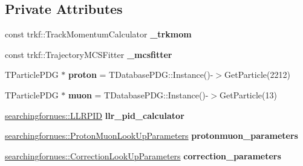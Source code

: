 \subsection*{Private Attributes}
\begin{DoxyCompactItemize}
\item 
const trkf\+::\+Track\+Momentum\+Calculator {\bfseries \+\_\+trkmom}\hypertarget{classanalysis_1_1TrackAnalysis_a22599de9de269967cfdfb8490fcc3897}{}\label{classanalysis_1_1TrackAnalysis_a22599de9de269967cfdfb8490fcc3897}

\item 
const trkf\+::\+Trajectory\+M\+C\+S\+Fitter {\bfseries \+\_\+mcsfitter}\hypertarget{classanalysis_1_1TrackAnalysis_a97631d64480702a4b7589a5bb9d735aa}{}\label{classanalysis_1_1TrackAnalysis_a97631d64480702a4b7589a5bb9d735aa}

\item 
T\+Particle\+P\+DG $\ast$ {\bfseries proton} = T\+Database\+P\+D\+G\+::\+Instance()-\/$>$Get\+Particle(2212)\hypertarget{classanalysis_1_1TrackAnalysis_a4adc7f89c334ab93747a8d4c4abbcc6d}{}\label{classanalysis_1_1TrackAnalysis_a4adc7f89c334ab93747a8d4c4abbcc6d}

\item 
T\+Particle\+P\+DG $\ast$ {\bfseries muon} = T\+Database\+P\+D\+G\+::\+Instance()-\/$>$Get\+Particle(13)\hypertarget{classanalysis_1_1TrackAnalysis_a0fe3b9e7864aaaa36b5f52826b4e3eb9}{}\label{classanalysis_1_1TrackAnalysis_a0fe3b9e7864aaaa36b5f52826b4e3eb9}

\item 
\hyperlink{classsearchingfornues_1_1LLRPID}{searchingfornues\+::\+L\+L\+R\+P\+ID} {\bfseries llr\+\_\+pid\+\_\+calculator}\hypertarget{classanalysis_1_1TrackAnalysis_a9aa071870faf165eb6548f0ea16e4132}{}\label{classanalysis_1_1TrackAnalysis_a9aa071870faf165eb6548f0ea16e4132}

\item 
\hyperlink{structsearchingfornues_1_1ProtonMuonLookUpParameters}{searchingfornues\+::\+Proton\+Muon\+Look\+Up\+Parameters} {\bfseries protonmuon\+\_\+parameters}\hypertarget{classanalysis_1_1TrackAnalysis_a872ba11642cf83d97e10940c29b57ee8}{}\label{classanalysis_1_1TrackAnalysis_a872ba11642cf83d97e10940c29b57ee8}

\item 
\hyperlink{structsearchingfornues_1_1CorrectionLookUpParameters}{searchingfornues\+::\+Correction\+Look\+Up\+Parameters} {\bfseries correction\+\_\+parameters}\hypertarget{classanalysis_1_1TrackAnalysis_aa554874a73d3330afdb12ee3ca031d47}{}\label{classanalysis_1_1TrackAnalysis_aa554874a73d3330afdb12ee3ca031d47}


\end{DoxyCompactItemize}
